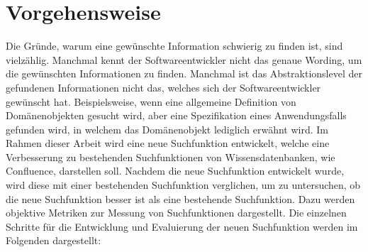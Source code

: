 \section{Vorgehensweise}
Die Gründe, warum eine gewünschte Information schwierig zu finden ist, sind vielzählig.
Manchmal kennt der Softwareentwickler nicht das genaue Wording, um die gewünschten Informationen zu finden.
Manchmal ist das Abstraktionslevel der gefundenen Informationen nicht das, welches sich der Softwareentwickler gewünscht hat.
Beispielsweise, wenn eine allgemeine Definition von Domänenobjekten gesucht wird, aber eine Spezifikation eines Anwendungsfalls gefunden wird, in welchem das Domänenobjekt lediglich erwähnt wird.
Im Rahmen dieser Arbeit wird eine neue Suchfunktion entwickelt, welche eine Verbesserung zu bestehenden Suchfunktionen von Wissensdatenbanken, wie Confluence, darstellen soll.
Nachdem die neue Suchfunktion entwickelt wurde, wird diese mit einer bestehenden Suchfunktion verglichen, um zu untersuchen, ob die neue Suchfunktion besser ist als eine bestehende Suchfunktion.
Dazu werden objektive Metriken zur Messung von Suchfunktionen dargestellt.
Die einzelnen Schritte für die Entwicklung und Evaluierung der neuen Suchfunktion werden im Folgenden dargestellt:
